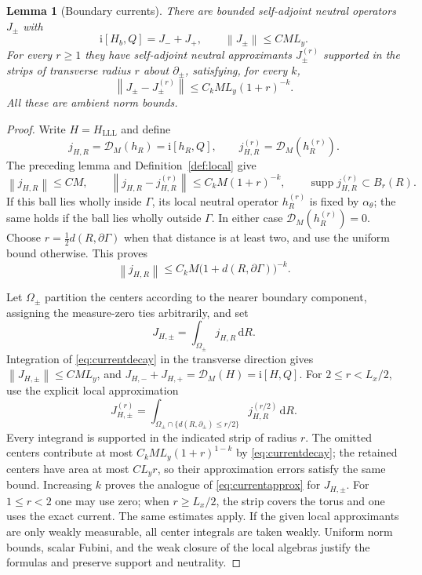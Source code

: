\documentclass[11pt]{article}
\newtheorem{lemma}[theorem]{Lemma}
\theoremstyle{definition}
\theoremstyle{remark}
\newcommand{\ii}{\mathrm i}
\newcommand{\dd}{\,\mathrm d}
\newcommand{\supp}{\operatorname{supp}}
\newcommand{\norm}[1]{\left\lVert#1\right\rVert}
\begin{document}
\begin{lemma}[Boundary currents]\label{lem:currents}
There are bounded self-adjoint neutral operators \(J_\pm\) with
\[
 \ii[H_b,Q]=J_-+J_+,\qquad \norm{J_\pm}\le CML_y.
\]
For every \(r\ge1\) they have self-adjoint neutral approximants
\(J_\pm^{(r)}\) supported in the strips of transverse radius
\(r\) about \(\partial_\pm\), satisfying, for every \(k\),
\begin{equation}\label{eq:currentapprox}
 \norm{J_\pm-J_\pm^{(r)}}
       \le C_kML_y(1+r)^{-k}.
\end{equation}
All these are ambient norm bounds.
\end{lemma}
\begin{proof}
Write \(H=H_{\mathrm{LLL}}\) and define
\[
 j_{H,R}=\mathcal D_M(h_R)=\ii[h_R,Q],\qquad
 j_{H,R}^{(r)}=\mathcal D_M(h_R^{(r)}).
\]
The preceding lemma and Definition~\ref{def:local} give
\[
 \norm{j_{H,R}}\le CM,\qquad
 \norm{j_{H,R}-j_{H,R}^{(r)}}\le C_kM(1+r)^{-k},\qquad
 \supp j_{H,R}^{(r)}\subset B_r(R).
\]
If this ball lies wholly inside \(\Gamma\), its local neutral
operator \(h_R^{(r)}\) is fixed by \(\alpha_\theta\); the same
holds if the ball lies wholly outside \(\Gamma\).
In either case \(\mathcal D_M(h_R^{(r)})=0\).
Choose \(r=\tfrac12d(R,\partial\Gamma)\) when that distance
is at least two, and use the uniform bound otherwise.  This proves
\begin{equation}\label{eq:currentdecay}
 \norm{j_{H,R}}\le C_kM
              \bigl(1+d(R,\partial\Gamma)\bigr)^{-k}.
\end{equation}

Let \(\Omega_\pm\) partition the centers according to the nearer
boundary component, assigning the measure-zero ties arbitrarily,
and set
\[
 J_{H,\pm}=\int_{\Omega_\pm}j_{H,R}\dd R.
\]
Integration of \eqref{eq:currentdecay} in the transverse direction
gives \(\norm{J_{H,\pm}}\le CML_y\), and
\(J_{H,-}+J_{H,+}=\mathcal D_M(H)=\ii[H,Q]\).
For \(2\le r<L_x/2\), use the explicit local approximation
\[
 J_{H,\pm}^{(r)}=
 \int_{\Omega_\pm\cap\{d(R,\partial_\pm)\le r/2\}}
                  j_{H,R}^{(r/2)}\dd R.
\]
Every integrand is supported in the indicated strip of radius
\(r\).  The omitted centers contribute at most
\(C_kML_y(1+r)^{1-k}\) by \eqref{eq:currentdecay}; the retained
centers have area at most \(CL_yr\), so their approximation
errors satisfy the same bound.  Increasing \(k\) proves the
analogue of \eqref{eq:currentapprox} for \(J_{H,\pm}\).
For \(1\le r<2\) one may use zero; when \(r\ge L_x/2\),
the strip covers the torus and one uses the exact current.
The same estimates apply.  If the given local
approximants are only weakly measurable, all center integrals
are taken weakly.  Uniform norm bounds, scalar Fubini, and the
weak closure of the local algebras justify the formulas and
preserve support and neutrality.


\end{proof}
\end{document}
